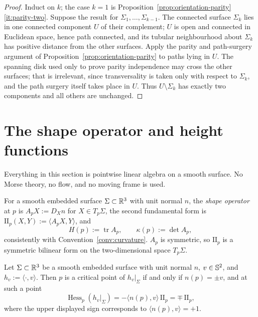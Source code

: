 \begin{proof}
Induct on $k$; the case $k=1$ is
Proposition~\ref{prop:orientation-parity}\ref{it:parity-two}.  Suppose the
result for $\Sigma_1,\dots,\Sigma_{k-1}$.  The connected surface $\Sigma_k$
lies in one connected component $U$ of their complement; $U$ is open and
connected in Euclidean space, hence path connected, and its tubular
neighbourhood about $\Sigma_k$ has positive distance from the other surfaces.
Apply the parity and path-surgery argument of
Proposition~\ref{prop:orientation-parity} to paths lying in $U$.  The spanning
disk used only to prove parity independence may cross the other surfaces; that
is irrelevant, since transversality is taken only with respect to $\Sigma_k$,
and the path surgery itself takes place in $U$.  Thus $U\setminus\Sigma_k$ has
exactly two components and all others are unchanged.
\end{proof}

\section{The shape operator and height functions}\label{sec:shape}

Everything in this section is pointwise linear algebra on a smooth surface.
No Morse theory, no flow, and no moving frame is used.

\begin{definition}\label{def:frame-free}
For a smooth embedded surface $\Sigma\subset\mathbb R^3$ with unit normal $n$, the
\emph{shape operator} at $p$ is $A_pX:=D_Xn$ for $X\in T_p\Sigma$, the second
fundamental form is $\mathrm{II}_p(X,Y):=\langle A_pX,Y\rangle$, and
\[
  H(p):=\operatorname{tr}A_p,\qquad \kappa(p):=\det A_p ,
\]
consistently with Convention~\ref{conv:curvature}.  $A_p$ is symmetric, so
$\mathrm{II}_p$ is a symmetric bilinear form on the two-dimensional space
$T_p\Sigma$.
\end{definition}

\begin{lemma}\label{lem:hess-height}
Let $\Sigma\subset\mathbb R^3$ be a smooth embedded surface with unit normal $n$,
$v\in\mathbb S^2$, and $h_v:=\langle\cdot,v\rangle$.  Then $p$ is a critical point
of $h_v|_\Sigma$ if and only if $n(p)=\pm v$, and at such a point
\begin{equation}\label{eq:hess-height}
  \operatorname{Hess}_p(h_v|_\Sigma)
  =-\langle n(p),v\rangle\,\mathrm{II}_p
  =\mp\,\mathrm{II}_p ,
\end{equation}
where the upper displayed sign corresponds to
$\langle n(p),v\rangle=+1$.
\end{lemma}

